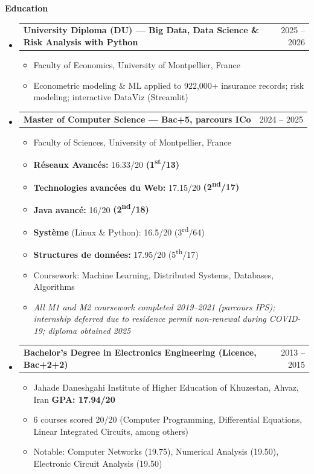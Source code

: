 \documentclass[11pt,a4paper]{article}
\makeatletter
\newcommand{\itemspace}{\vspace{0.4em}}
\newcommand{\sectionspace}{\itemspace}
\newcommand{\subspace}{\vspace{0.5em}}
\newcommand{\cvsection}[1]{
    \sectionspace
    \noindent\textcolor{primary}{\Large \textbf{#1}} \textcolor{primary}{\hrulefill}
    \par\vspace{0.4em}
}
\newcommand{\headerrow}[2]{
    \begin{tabular*}{\linewidth}{l@{\extracolsep{\fill}}r}
    #1 & \textcolor{primary}{#2} \\
    \end{tabular*}
}
\makeatother
\begin{document}
\cvsection{Education}
\begin{itemize}[leftmargin=1em, label={}]

    \item
    \headerrow{\textbf{University Diploma (DU) — Big Data, Data Science \& Risk Analysis with Python}}{2025 -- 2026}
    \begin{itemize}[leftmargin=1.5em, label=$\bullet$, nosep]
        \item Faculty of Economics, University of Montpellier, France
        \item Econometric modeling \& ML applied to 922,000+ insurance records; risk modeling; interactive DataViz (Streamlit)
    \end{itemize}

    \subspace
    \item
    \headerrow{\textbf{Master of Computer Science — Bac+5, parcours ICo}}{2024 -- 2025}
    \begin{itemize}[leftmargin=1.5em, label=$\bullet$, nosep]
        \item Faculty of Sciences, University of Montpellier, France
        \item \textbf{R\'eseaux Avanc\'es:} 16.33/20 \textbf{(1\textsuperscript{st}/13)}
        \item \textbf{Technologies avanc\'ees du Web:} 17.15/20 \textbf{(2\textsuperscript{nd}/17)}
        \item \textbf{Java avanc\'e:} 16/20 \textbf{(2\textsuperscript{nd}/18)}
        \item \textbf{Syst\`eme} (Linux \& Python): 16.5/20 (3\textsuperscript{rd}/64)
        \item \textbf{Structures de donn\'ees:} 17.95/20 (5\textsuperscript{th}/17)
        \item Coursework: Machine Learning, Distributed Systems, Databases, Algorithms
        \item \textit{All M1 and M2 coursework completed 2019--2021 (parcours IPS); internship deferred due to residence permit non-renewal during COVID-19; diploma obtained 2025}
    \end{itemize}

    \subspace
    \item
    \headerrow{\textbf{Bachelor's Degree in Electronics Engineering (Licence, Bac+2+2)}}{2013 -- 2015}
    \begin{itemize}[leftmargin=1.5em, label=$\bullet$, nosep]
        \item Jahade Daneshgahi Institute of Higher Education of Khuzestan, Ahvaz, Iran \quad \textbf{GPA: 17.94/20}
        \item 6 courses scored 20/20 (Computer Programming, Differential Equations, Linear Integrated Circuits, among others)
        \item Notable: Computer Networks (19.75), Numerical Analysis (19.50), Electronic Circuit Analysis (19.50)
    \end{itemize}

\end{itemize}
\end{document}
